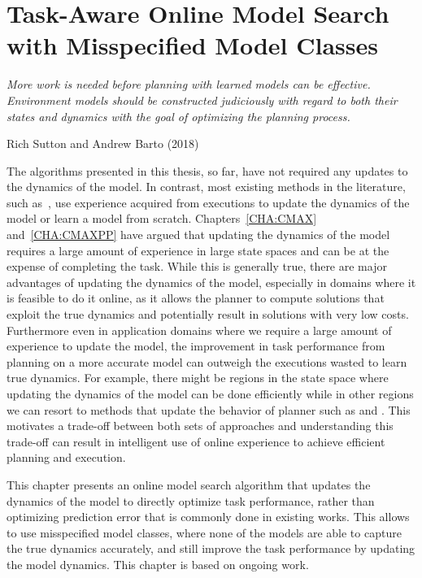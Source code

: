 
\chapter{Task-Aware Online Model Search with Misspecified Model Classes}
\label{CHA:TAML}

\epigraph{\textit{More work is needed before planning with learned
    models can be effective. Environment models should be
    constructed judiciously with regard to both their states and
    dynamics with the goal of optimizing the planning process.}}{Rich
  Sutton and Andrew Barto (2018)}

The algorithms presented in this thesis, so
far, have not required any updates to the dynamics of the model. In
contrast, most existing methods in the literature, such
as~\cite{DBLP:journals/ml/KearnsS02, DBLP:journals/jmlr/BrafmanT02,
  DBLP:conf/atal/JongS07, DBLP:journals/arc/Ljung10, DBLP:conf/icml/AbbeelN05,
  DBLP:journals/pami/DeisenrothFR15, DBLP:conf/icml/AbbeelQN06,
  DBLP:conf/icml/RossB12, 
  DBLP:conf/aaai/Jiang18, rastogi2018sample}, use experience
acquired from executions to update the dynamics of the model or learn
a model from scratch.
Chapters~\ref{CHA:CMAX} and~\ref{CHA:CMAXPP} have
argued that updating the dynamics of the model requires a large amount
of experience in large state spaces and can be at the expense of
completing the task. While this is generally true, there are major
advantages of updating the dynamics of the model, especially in
domains where it
is feasible to do it online, as it allows the planner to compute
solutions that exploit the true dynamics and potentially result in
solutions with very low costs. Furthermore even in application domains
where we require a large amount of experience to update the model,
the improvement in task performance from planning on a more accurate
model can outweigh the executions wasted to learn true dynamics. For
example, there might be regions in the state space where updating the
dynamics of the model can be done efficiently while in other regions
we can resort to methods that update the behavior of planner such as
\cmax{} and \cmaxpp{}. This motivates a trade-off between both sets of
approaches and understanding this trade-off can result in intelligent
use of online experience to achieve efficient planning and
execution.

This chapter presents \taml{} an online model search algorithm that updates
the dynamics of the model to directly optimize task performance,
rather than optimizing prediction error that is commonly done in
existing works. This allows \taml{} to use misspecified model classes,
where none of the models are able to capture the true dynamics
accurately, and still improve the task performance by updating the
model dynamics. This chapter is based on ongoing work.

